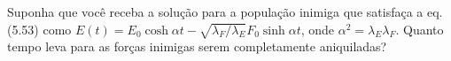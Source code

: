 Suponha que você receba a solução para a população inimiga que satisfaça a eq. (5.53) como $E(t) = E_0 \cosh \alpha t - \sqrt{\lambda_F / \lambda_E} F_0 \sinh \alpha t$, onde $\alpha^2 = \lambda_E \lambda_F$. Quanto tempo leva para as forças inimigas serem completamente aniquiladas?
